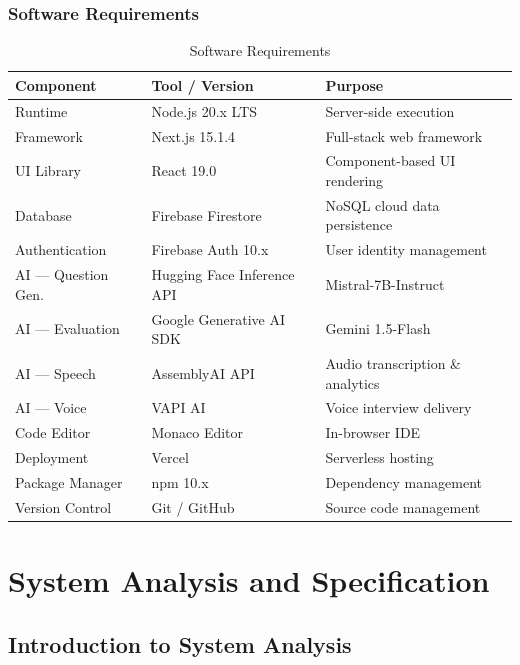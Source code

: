 \documentclass[12pt,a4paper,oneside]{report}
\begin{document}
\subsection{Software Requirements}

\begin{table}[H]
\centering
\caption{Software Requirements}
\label{tab:software}
\begin{tabular}{|p{4cm}|p{5cm}|p{4.5cm}|}
\hline
\textbf{Component} & \textbf{Tool / Version} & \textbf{Purpose} \\
\hline
Runtime & Node.js 20.x LTS & Server-side execution \\
\hline
Framework & Next.js 15.1.4 & Full-stack web framework \\
\hline
UI Library & React 19.0 & Component-based UI rendering \\
\hline
Database & Firebase Firestore & NoSQL cloud data persistence \\
\hline
Authentication & Firebase Auth 10.x & User identity management \\
\hline
AI --- Question Gen. & Hugging Face Inference API & Mistral-7B-Instruct \\
\hline
AI --- Evaluation & Google Generative AI SDK & Gemini 1.5-Flash \\
\hline
AI --- Speech & AssemblyAI API & Audio transcription \& analytics \\
\hline
AI --- Voice & VAPI AI & Voice interview delivery \\
\hline
Code Editor & Monaco Editor & In-browser IDE \\
\hline
Deployment & Vercel & Serverless hosting \\
\hline
Package Manager & npm 10.x & Dependency management \\
\hline
Version Control & Git / GitHub & Source code management \\
\hline
\end{tabular}
\end{table}


\chapter{System Analysis and Specification}
\label{ch:system_analysis}

\section{Introduction to System Analysis}
\end{document}
